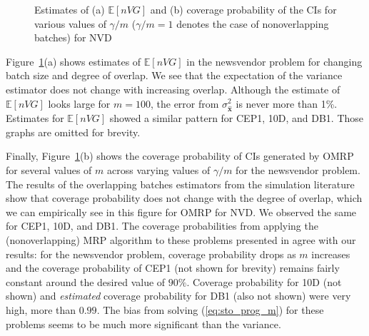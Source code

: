\documentclass[12pt]{article}
\newcommand{\e}[1]{\mathbb{E} \left[ #1 \right]
}
\newcommand{\x}{\mathbf{x}}
\newcommand{\xh}{{\hat{\x}}}
\begin{document}
\begin{figure}[htb!]
	\centering
	\caption{ 
		Estimates of
		(a) $\e{nVG}$ and 
		(b) coverage probability of the CIs for various values of $\gamma/m$ ($\gamma/m=1$ denotes the case of nonoverlapping batches)
		 for NVD
	}
\label{fig:nv}
\end{figure}


Figure~\ref{fig:nv}(a) shows estimates of $\e{nVG}$ in the newsvendor problem for changing batch size and degree of overlap. 
We see that the expectation of the variance estimator does not change with increasing overlap. 
Although the estimate of $\e{nVG}$ looks large for $m=100$, the error from $\sigma^2_\xh$ is never more than 1\%.  
Estimates for $\e{nVG}$ showed a similar pattern for CEP1, 10D, and DB1.  
Those graphs are omitted for brevity.

Finally, Figure~\ref{fig:nv}(b) shows the coverage probability of CIs generated by OMRP for several values of $m$ across varying values of $\gamma/m$ for the newsvendor problem.  
The results of the overlapping batches estimators from the simulation literature show that coverage probability does not change with the degree of overlap, which we can  empirically see in this figure for OMRP for NVD.
We observed the same for CEP1, 10D, and DB1.  
The coverage probabilities from applying the (nonoverlapping) MRP algorithm to these problems presented in \citep{Bayraksan2006} agree with our results: for the newsvendor problem, coverage probability drops as $m$ increases and the coverage probability of CEP1 (not shown for brevity) remains fairly constant around the desired value of $90\%$. 
Coverage probability for 10D (not shown) and {\it estimated} coverage probability for DB1 (also not shown) were very high, more than $0.99$.  
The bias from solving (\ref{eq:sto_prog_m}) for these problems seems to be much more significant than the variance.
\end{document}
